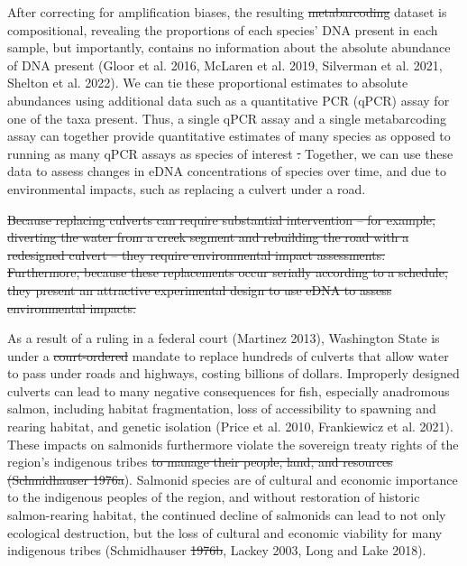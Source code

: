 \documentclass[
]{article}
\providecommand{\DIFaddtex}[1]{{\protect\color{blue}\uwave{#1}}} %
\providecommand{\DIFdeltex}[1]{{\protect\color{red}\sout{#1}}}                      %
\providecommand{\DIFaddbegin}{} %
\providecommand{\DIFaddend}{} %
\providecommand{\DIFdelbegin}{} %
\providecommand{\DIFdelend}{} %
\providecommand{\DIFadd}[1]{\texorpdfstring{\DIFaddtex{#1}}{#1}} %
\providecommand{\DIFdel}[1]{\texorpdfstring{\DIFdeltex{#1}}{}} %
\newcommand{\DIFscaledelfig}{0.5}
\newlength{\DIFdelgraphicswidth} %
\newlength{\DIFdelgraphicsheight} %
\newcommand{\DIFaddincludegraphics}[2][]{{\color{blue}\fbox{\DIFOincludegraphics[#1]{#2}}}} %
\newcommand{\DIFdelincludegraphics}[2][]{%
\sbox{\DIFdelgraphicsbox}{\DIFOincludegraphics[#1]{#2}}%
\settoboxwidth{\DIFdelgraphicswidth}{\DIFdelgraphicsbox} %
\settoboxtotalheight{\DIFdelgraphicsheight}{\DIFdelgraphicsbox} %
\scalebox{\DIFscaledelfig}{%
\parbox[b]{\DIFdelgraphicswidth}{\usebox{\DIFdelgraphicsbox}\\[-\baselineskip] \rule{\DIFdelgraphicswidth}{0em}}\llap{\resizebox{\DIFdelgraphicswidth}{\DIFdelgraphicsheight}{%
\setlength{\unitlength}{\DIFdelgraphicswidth}%
\begin{picture}(1,1)%
\thicklines\linethickness{2pt} %
{\color[rgb]{1,0,0}\put(0,0){\framebox(1,1){}}}%
{\color[rgb]{1,0,0}\put(0,0){\line( 1,1){1}}}%
{\color[rgb]{1,0,0}\put(0,1){\line(1,-1){1}}}%
\end{picture}%
}\hspace*{3pt}}} %
} %
\DeclareRobustCommand{\DIFaddbegin}{\DIFOaddbegin \let\includegraphics\DIFaddincludegraphics} %
\DeclareRobustCommand{\DIFaddend}{\DIFOaddend \let\includegraphics\DIFOincludegraphics} %
\DeclareRobustCommand{\DIFdelbegin}{\DIFOdelbegin \let\includegraphics\DIFdelincludegraphics} %
\DeclareRobustCommand{\DIFdelend}{\DIFOaddend \let\includegraphics\DIFOincludegraphics} %
\begin{document}
After correcting for amplification biases, the resulting \DIFdelbegin \DIFdel{metabarcoding
}\DIFdelend dataset is
compositional, revealing the proportions of each species' DNA present in
each sample, but importantly, contains no information about the absolute
abundance of DNA present (Gloor et al. 2016, McLaren et al. 2019,
Silverman et al. 2021, Shelton et al. 2022). We can tie these
proportional estimates to absolute abundances using additional data such
as a quantitative PCR (qPCR) assay for one of the taxa present. Thus, a
single qPCR assay and a single metabarcoding assay can together provide
quantitative estimates of many species as opposed to running as many
qPCR assays as species of interest \DIFdelbegin \DIFdel{. }\DIFdelend \DIFaddbegin \DIFadd{(see also (Pont et al. 2022)).
}\DIFaddend Together, we can use these data to assess changes in eDNA concentrations
of species over time, and due to environmental impacts, such as
replacing a culvert under a road.

\DIFdelbegin \DIFdel{Because replacing culverts can require substantial intervention -- for
example, diverting the water from a creek segment and rebuilding the
road with a redesigned culvert -- they require environmental impact
assessments. Furthermore, because these replacements occur serially
according to a schedule, they present an attractive experimental design
to use eDNA to assess environmental impacts.
}%

\DIFdelend As a result of a ruling in a federal court (Martinez 2013), Washington
State is under a \DIFdelbegin \DIFdel{court-ordered }\DIFdelend mandate to replace hundreds of culverts that allow
water to pass under roads and highways, costing billions of dollars.
Improperly designed culverts can lead to many negative consequences for
fish, especially anadromous salmon, including habitat fragmentation,
loss of accessibility to spawning and rearing habitat, and genetic
isolation (Price et al. 2010, Frankiewicz et al. 2021). These impacts on
salmonids furthermore violate the sovereign treaty rights of the
region's indigenous tribes \DIFdelbegin \DIFdel{to manage their people, land,
and resources (Schmidhauser 1976a}\DIFdelend \DIFaddbegin \DIFadd{(Martinez 2013}\DIFaddend ). Salmonid species are of
cultural and economic importance to the indigenous peoples of the
region, and without restoration of historic salmon-rearing habitat, the
continued decline of salmonids can lead to not only ecological
destruction, but the loss of cultural and economic viability for many
indigenous tribes (Schmidhauser \DIFdelbegin \DIFdel{1976b}\DIFdelend \DIFaddbegin \DIFadd{1976}\DIFaddend , Lackey 2003, Long and Lake 2018).
\end{document}
